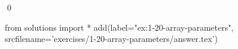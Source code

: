 
\begin{ex}
  \label{ex:1-20-array-parameters}
  
  \qed
\end{ex}
\begin{python0}
from solutions import *
add(label="ex:1-20-array-parameters",
    srcfilename='exercises/1-20-array-parameters/answer.tex')
\end{python0}
